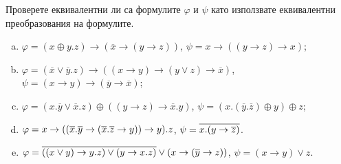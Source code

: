 \begin{problem} %
  Проверете еквивалентни ли са формулите $\varphi$ и $\psi$ като използвате еквивалентни преобразования на формулите.
  \begin{enumerate}[a)]
  \item
    $\varphi = (x\oplus y.z)\rightarrow (\overline{x}\rightarrow (y\rightarrow z))$,
    $\psi = x\rightarrow ((y\rightarrow z)\rightarrow x)$;
  \item
    $\varphi = (\overline{x}\vee \overline{y}.z)\rightarrow ((x\rightarrow y)\rightarrow (y\vee z)\rightarrow\overline{x})$,
    $\psi = (x\rightarrow y)\rightarrow(\overline{y}\rightarrow\overline{x})$;
  \item
    $\varphi = (x.\overline{y}\vee \overline{x}.z)\oplus ((y\rightarrow z)\rightarrow \overline{x}.y)$,
    $\psi = (x.(\overline{y}.\overline{z})\oplus y)\oplus z$;
  \item
    $\varphi = x\rightarrow ((\overline{x}.\overline{y}\rightarrow(\overline{x}.\overline{z}\rightarrow y))\rightarrow y).z$,
    $\psi = \overline{x.(y\rightarrow\overline{z})}$.
  \item
    $\varphi = \overline{((x\vee y) \rightarrow y.z)\vee (y\rightarrow x.z)} \vee (x\rightarrow (\overline{y}\rightarrow z))$,
    $\psi = (x\rightarrow y)\vee z$.
  \end{enumerate}
\end{problem}
